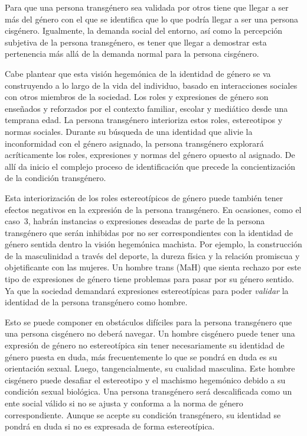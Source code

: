 Para que una persona transgénero sea validada por otros
tiene que llegar a ser más del género con el que se identifica que lo que podría
llegar a ser una persona cisgénero. Igualmente, la demanda social del entorno,
así como la percepción subjetiva de la persona transgénero, es tener que llegar
a demostrar esta pertenencia más allá de la demanda normal para la persona
cisgénero.

Cabe plantear que esta visión hegemónica de la identidad de género se va
construyendo a lo largo de la vida del individuo, basado en interacciones
sociales con otros miembros de la sociedad. Los roles y expresiones de género
son enseñados y reforzados por el contexto familiar, escolar y mediático desde
una temprana edad. La persona transgénero interioriza estos roles, estereotipos
y normas sociales. Durante su búsqueda de una identidad que alivie la
inconformidad con el género asignado, la persona transgénero explorará
acríticamente los roles, expresiones y normas del género opuesto al asignado. De
allí da inicio el complejo proceso de identificación que precede la
concientización de la condición transgénero.

Esta interiorización de los roles estereotípicos de género puede también tener
efectos negativos en la expresión de la persona transgénero. En ocasiones, como
el caso~3, habrán instancias o expresiones deseadas de parte de la persona
transgénero que serán inhibidas por no ser correspondientes con la identidad de
género sentida dentro la visión hegemónica machista. Por ejemplo, la
construcción de la masculinidad a través del deporte, la dureza física y la
relación promiscua y objetificante con las mujeres. Un hombre trans (MaH) que
sienta rechazo por este tipo de expresiones de género tiene problemas para pasar
por su género sentido. Ya que la sociedad demandará expresiones estereotípicas
para poder \emph{validar} la identidad de la persona transgénero como hombre.

Esto se puede componer en obstáculos difíciles para la persona transgénero que
una persona cisgénero no deberá navegar. Un hombre cisgénero puede tener una
expresión de género no estereotípica sin tener necesariamente su identidad de
género puesta en duda, más frecuentemente lo que se pondrá en duda es su
orientación sexual. Luego, tangencialmente, su cualidad masculina. Este hombre
cisgénero puede desafiar el estereotipo y el machismo hegemónico debido a su
condición sexual biológica. Una persona transgénero será descalificada como un
ente social válido si no se ajusta y conforma a la norma de género
correspondiente. Aunque se acepte su condición transgénero, su identidad se
pondrá en duda si no es expresada de forma estereotípica.


